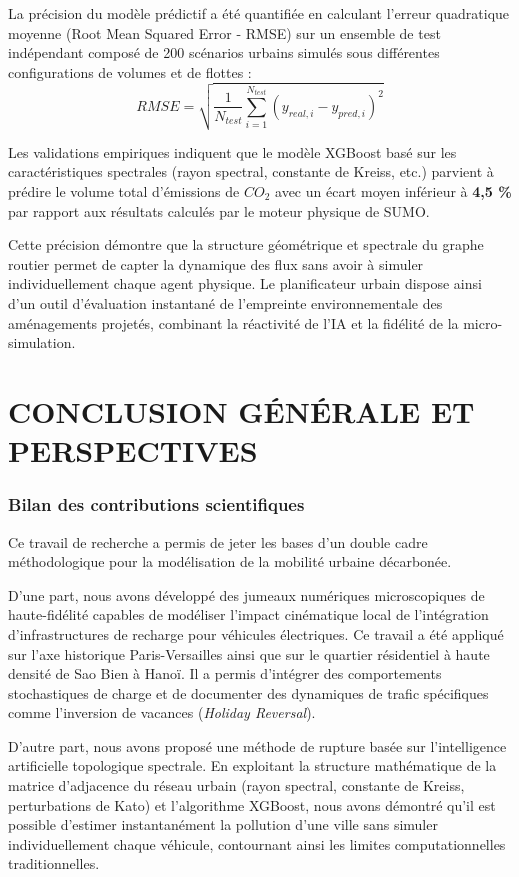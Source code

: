 \documentclass[11pt, a4paper]{article}
\begin{document}
La précision du modèle prédictif a été quantifiée en calculant l'erreur
quadratique moyenne (Root Mean Squared Error - RMSE) sur un ensemble de
test indépendant composé de 200 scénarios urbains simulés sous
différentes configurations de volumes et de flottes :
\[RMSE = \sqrt{\frac{1}{N_{test}} \sum_{i=1}^{N_{test}} \left( y_{real, i} - y_{pred, i} \right)^2}\]

Les validations empiriques indiquent que le modèle XGBoost basé sur les
caractéristiques spectrales (rayon spectral, constante de Kreiss, etc.)
parvient à prédire le volume total d'émissions de \(CO_2\) avec un écart
moyen inférieur à \textbf{4,5 \%} par rapport aux résultats calculés par
le moteur physique de SUMO.

Cette précision démontre que la structure géométrique et spectrale du
graphe routier permet de capter la dynamique des flux sans avoir à
simuler individuellement chaque agent physique. Le planificateur urbain
dispose ainsi d'un outil d'évaluation instantané de l'empreinte
environnementale des aménagements projetés, combinant la réactivité de
l'IA et la fidélité de la micro-simulation.

\newpage

\section{CONCLUSION GÉNÉRALE ET
PERSPECTIVES}\label{conclusion-guxe9nuxe9rale-et-perspectives}

\subsubsection{Bilan des contributions
scientifiques}\label{bilan-des-contributions-scientifiques}

Ce travail de recherche a permis de jeter les bases d'un double cadre
méthodologique pour la modélisation de la mobilité urbaine décarbonée.

D'une part, nous avons développé des jumeaux numériques microscopiques
de haute-fidélité capables de modéliser l'impact cinématique local de
l'intégration d'infrastructures de recharge pour véhicules électriques.
Ce travail a été appliqué sur l'axe historique Paris-Versailles ainsi
que sur le quartier résidentiel à haute densité de Sao Bien à Hanoï. Il
a permis d'intégrer des comportements stochastiques de charge et de
documenter des dynamiques de trafic spécifiques comme l'inversion de
vacances (\emph{Holiday Reversal}).

D'autre part, nous avons proposé une méthode de rupture basée sur
l'intelligence artificielle topologique spectrale. En exploitant la
structure mathématique de la matrice d'adjacence du réseau urbain (rayon
spectral, constante de Kreiss, perturbations de Kato) et l'algorithme
XGBoost, nous avons démontré qu'il est possible d'estimer instantanément
la pollution d'une ville sans simuler individuellement chaque véhicule,
contournant ainsi les limites computationnelles traditionnelles.
\end{document}
